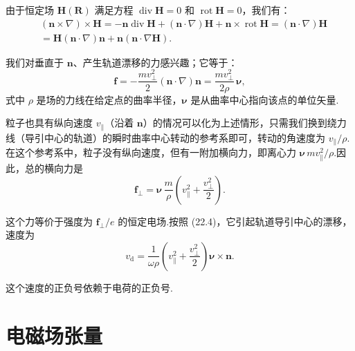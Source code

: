\begin{xiti}
由于恒定场 $\boldsymbol{H}(\boldsymbol{R})$ 满足方程 $\operatorname{div}\boldsymbol{H}=0$ 和
$\operatorname{rot}\boldsymbol{H}=0$，我们有：
\begin{equation*}
\begin{aligned}
  &\left(\boldsymbol{n}\times\nabla\right)\times\boldsymbol{H}
  =-\boldsymbol{n}\operatorname{div}\boldsymbol{H}
  +\left(\boldsymbol{n}\cdot\nabla\right)\boldsymbol{H}
  +\boldsymbol{n}\times\operatorname{rot}\boldsymbol{H}
  =\left(\boldsymbol{n}\cdot\nabla\right)\boldsymbol{H}\\
  &=\boldsymbol{H}\left(\boldsymbol{n}\cdot\nabla\right)\boldsymbol{n}
  +\boldsymbol{n}\left(\boldsymbol{n}\cdot\nabla\boldsymbol{H}\right).
\end{aligned}
\end{equation*}

我们对垂直于 $\boldsymbol{n}$、产生轨道漂移的力感兴趣；它等于：
\begin{equation*}
  \boldsymbol{f}=-\frac{mv_\perp^2}{2}
  \left(\boldsymbol{n}\cdot\nabla\right)\boldsymbol{n}
  =\frac{mv_\perp^2}{2\rho}\,\boldsymbol{\nu},
\end{equation*}
式中 $\rho$ 是场的力线在给定点的曲率半径，$\boldsymbol{\nu}$ 是从曲率中心指向该点的单位矢量.

粒子也具有纵向速度 $v_\parallel$（沿着 $\boldsymbol{n}$）的情况可以化为上述情形，只需我们换到绕力线（导引中心的轨道）的瞬时曲率中心转动的参考系即可，转动的角速度为
$v_\parallel/\rho$.在这个参考系中，粒子没有纵向速度，但有一附加横向力，即离心力
$\boldsymbol{\nu}\,mv_\parallel^2/\rho$.因此，总的横向力是
\begin{equation*}
  \boldsymbol{f}_\perp=\boldsymbol{\nu}\,\frac{m}{\rho}
  \left(v_\parallel^2+\frac{v_\perp^2}{2}\right).
\end{equation*}

这个力等价于强度为 $\boldsymbol{f}_\perp/e$ 的恒定电场.按照 (22.4)，它引起轨道导引中心的漂移，速度为
\begin{equation*}
  v_{\mathrm{d}}=\frac{1}{\omega\rho}
  \left(v_\parallel^2+\frac{v_\perp^2}{2}\right)\boldsymbol{\nu}\times\boldsymbol{n}.
\end{equation*}

这个速度的正负号依赖于电荷的正负号.

\end{xiti}

\section{电磁场张量}

